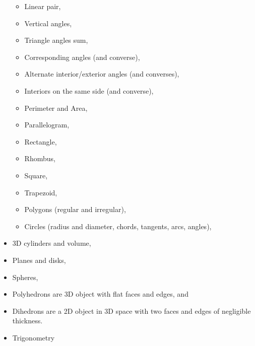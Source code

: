 \begin{itemize}
  \begin{itemize}
  \tightlist
  \item
    Linear pair,
  \item
    Vertical angles,
  \item
    Triangle angles sum,
  \item
    Corresponding angles (and converse),
  \item
    Alternate interior/exterior angles (and converses),
  \item
    Interiors on the same side (and converse),
  \item
    Perimeter and Area,
  \item
    Parallelogram,
  \item
    Rectangle,
  \item
    Rhombus,
  \item
    Square,
  \item
    Trapezoid,
  \item
    Polygons (regular and irregular),
  \item
    Circles (radius and diameter, chords, tangents, arcs, angles),
  \end{itemize}
\item
  3D cylinders and volume,
\item
  Planes and disks,
\item
  Spheres,
\item
  Polyhedrons are 3D object with flat faces and edges, and
\item
  Dihedrons are a 2D object in 3D space with two faces and edges of
  negligible thickness.
\item
  Trigonometry


\end{itemize}

